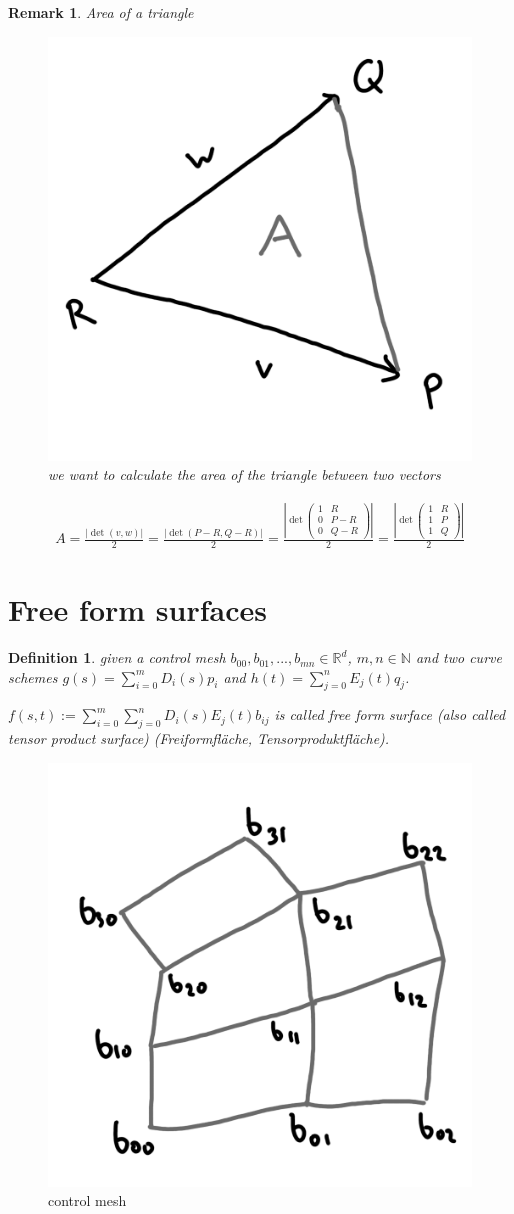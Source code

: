 \documentclass[]{article}
\newtheorem{definition}{Definition}
\newtheorem{remark}{Remark}
\begin{document}
\begin{remark}
	Area of a triangle
	
	\begin{figure}[h!]
		\centering
		\includegraphics[width=0.3\linewidth]{figures/area_triangle}
		\caption{we want to calculate the area of the triangle between two vectors}
		\label{fig:area_triangle}
	\end{figure}
	
	\begin{align*}
		A = \frac{|\det(v,w)|}{2} = \frac{|\det (P-R, Q-R)|}{2} = \frac{\left|\det\left(\begin{matrix} 1 & R\\ 0 & P-R\\ 0 & Q-R \end{matrix}\right)\right|}{2} = \frac{\left|\det\left(\begin{matrix} 1 & R\\ 1 & P\\ 1 & Q \end{matrix}\right)\right|}{2}
	\end{align*}
\end{remark}

\section{Free form surfaces}

\begin{definition}
	given a control mesh $b_{00}, b_{01}, ..., b_{mn} \in \mathbb{R}^d$, $m,n \in \mathbb{N}$ and two curve schemes $g(s) = \sum_{i=0}^{m}D_i(s)p_i$ and $h(t)=\sum_{j=0}^{n}E_j(t)q_j$.
	
	$f(s,t) := \sum_{i=0}^{m} \sum_{j=0}^{n} D_i(s) E_j(t) b_{ij}$ is called free form surface (also called tensor product surface) (Freiformfläche, Tensorproduktfläche).
\end{definition}

\begin{figure}[h!]
	\centering
	\includegraphics[width=0.3\linewidth]{figures/control_mesh}
	\caption{control mesh}
	\label{fig:control_mesh}
\end{figure}
\end{document}
